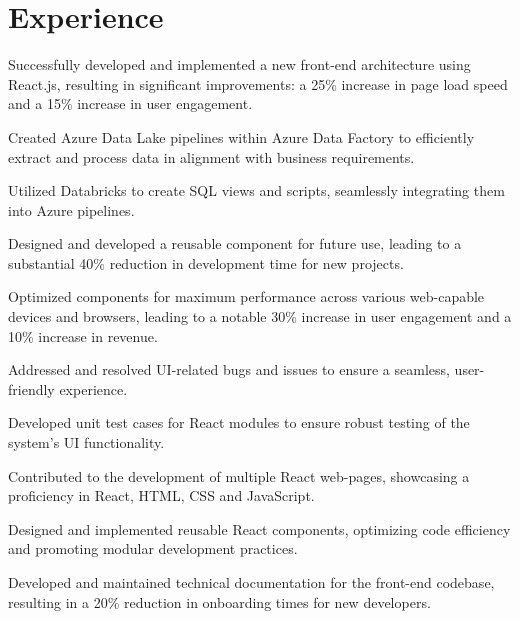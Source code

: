 \documentclass[]{deedy-resume-openfont}
\begin{document}
\hfill
\begin{minipage}[t]{0.66\textwidth} 


\section{Experience}

\vspace{\topsep} %
\begin{tightemize}
\item Successfully developed and implemented a new front-end architecture using React.js, resulting in significant improvements: a 25\% increase in page load speed and a 15\% increase in user engagement.
\item Created Azure Data Lake pipelines within Azure Data Factory to efficiently extract and process data in alignment with business requirements.
\item Utilized Databricks to create SQL views and scripts, seamlessly integrating them into Azure pipelines.
\item Designed and developed a reusable component for future use, leading to a substantial 40\% reduction in development time for new projects.
\item Optimized components for maximum performance across various web-capable devices and browsers, leading to a notable 30\% increase in user engagement and a 10\% increase in revenue.
\item Addressed and resolved UI-related bugs and issues to ensure a seamless, user-friendly experience.
\item Developed unit test cases for React modules to ensure robust testing of the system's UI functionality.
\end{tightemize}
\sectionsep

\begin{tightemize}
\item Contributed to the development of multiple React web-pages, showcasing a proficiency in React, HTML, CSS and JavaScript.
\item Designed and implemented reusable React components, optimizing code efficiency and promoting modular development practices.
\item Developed and maintained technical documentation for the front-end codebase, resulting in a 20\% reduction in onboarding times for new developers.
\end{tightemize}
\sectionsep


\end{minipage}
\end{document}
